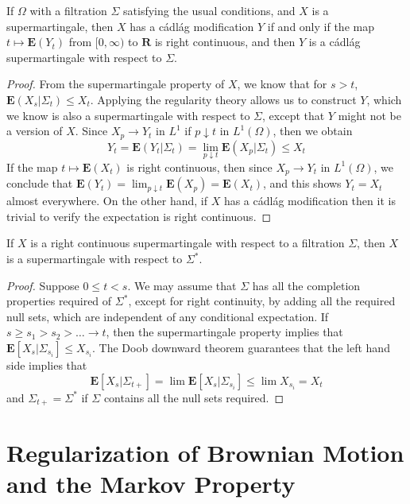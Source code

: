 \begin{theorem}
    If $\Omega$ with a filtration $\Sigma$ satisfying the usual conditions, and $X$ is a supermartingale, then $X$ has a c\'{a}dl\'{a}g modification $Y$ if and only if the map $t \mapsto \mathbf{E}(Y_t)$ from $[0,\infty)$ to $\mathbf{R}$ is right continuous, and then $Y$ is a c\'{a}dl\'{a}g supermartingale with respect to $\Sigma$.
\end{theorem}
\begin{proof}
    From the supermartingale property of $X$, we know that for $s > t$, $\mathbf{E}(X_s|\Sigma_t) \leq X_t$. Applying the regularity theory allows us to construct $Y$, which we know is also a supermartingale with respect to $\Sigma$, except that $Y$ might not be a version of $X$. Since $X_p \to Y_t$ in $L^1$ if $p \downarrow t$ in $L^1(\Omega)$, then we obtain
    \[ Y_t = \mathbf{E}(Y_t|\Sigma_t) = \lim_{p \downarrow t} \mathbf{E}(X_p|\Sigma_t) \leq X_t \]
    If the map $t \mapsto \mathbf{E}(X_t)$ is right continuous, then since $X_p \to Y_t$ in $L^1(\Omega)$, we conclude that $\mathbf{E}(Y_t) = \lim_{p \downarrow t} \mathbf{E}(X_p) = \mathbf{E}(X_t)$, and this shows $Y_t = X_t$ almost everywhere. On the other hand, if $X$ has a c\'{a}dl\'{a}g modification then it is trivial to verify the expectation is right continuous.
\end{proof}

\begin{lemma}
    If $X$ is a right continuous supermartingale with respect to a filtration $\Sigma$, then $X$ is a supermartingale with respect to $\Sigma^*$.
\end{lemma}
\begin{proof}
    Suppose $0 \leq t < s$. We may assume that $\Sigma$ has all the completion properties required of $\Sigma^*$, except for right continuity, by adding all the required null sets, which are independent of any conditional expectation. If $s \geq s_1 > s_2 > \dots \to t$, then the supermartingale property implies that $\mathbf{E}[X_s|\Sigma_{s_i}] \leq X_{s_i}$. The Doob downward theorem guarantees that the left hand side implies that
    \[ \mathbf{E}[X_s|\Sigma_{t+}] = \lim \mathbf{E}[X_s|\Sigma_{s_i}] \leq \lim X_{s_i} = X_t \]
    and $\Sigma_{t+} = \Sigma^*$ if $\Sigma$ contains all the null sets required.
\end{proof}

\section{Regularization of Brownian Motion and the Markov Property}

